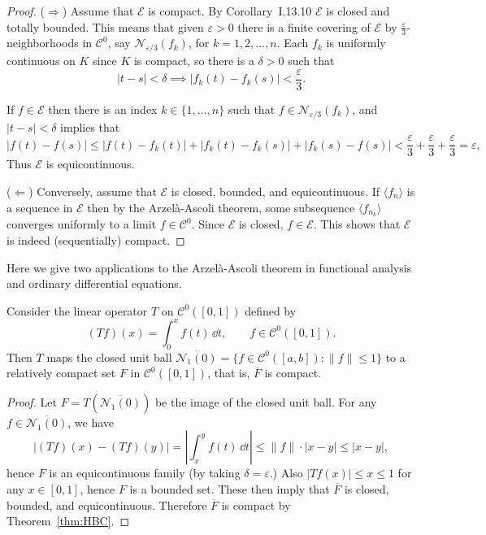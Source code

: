 \documentclass[11pt]{article}
\begin{document}
\begin{proof}
  ($\Rightarrow$) Assume that $\mathcal{E}$ is compact.
  By Corollary~I.13.10 $\mathcal{E}$ is closed and totally bounded.
  This means that given $\varepsilon > 0$ there is a finite covering of $\mathcal{E}$ by $\frac{\varepsilon}{3}$-neighborhoods in $\mathcal{C}^0$, say $\mathcal{N}_{\varepsilon/3}(f_k)$, for $k = 1, 2, \dots, n$.
  Each $f_k$ is uniformly continuous on $K$ since $K$ is compact, so there is a $\delta > 0$ such that
  \[
    |t-s| < \delta \implies |f_k(t) - f_k(s)| < \frac{\varepsilon}{3}.
  \]

  If $f \in \mathcal{E}$ then there is an index $k \in \{ 1, \dots, n \}$ such that $f \in \mathcal{N}_{\varepsilon/3}(f_k)$, and $|t-s| < \delta$ implies that
  \[
    |f(t) - f(s)| \leqslant |f(t) - f_k(t)| + |f_k(t) - f_k(s)| + |f_k(s) - f(s)| < \frac{\varepsilon}{3} + \frac{\varepsilon}{3} + \frac{\varepsilon}{3} = \varepsilon,
  \]
  Thus $\mathcal{E}$ is equicontinuous.

  ($\Leftarrow$) Conversely, assume that $\mathcal{E}$ is closed, bounded, and equicontinuous.
  If $\langle f_n \rangle$ is a sequence in $\mathcal{E}$ then by the Arzel\`a-Ascoli theorem, some subsequence $\langle f_{n_k} \rangle$ converges uniformly to a limit $f \in \mathcal{C}^0$.
  Since $\mathcal{E}$ is closed, $f \in \mathcal{E}$.
  This shows that $\mathcal{E}$ is indeed (sequentially) compact.
\end{proof}

Here we give two applications to the Arzel\`a-Ascoli theorem in functional analysis and ordinary differential equations.

\begin{cor}
  Consider the linear operator $T$ on $\mathcal{C}^0([0,1])$ defined by
  \[
    (Tf)(x) = \int_0^x f(t) \, \dd t, \qquad f \in \mathcal{C}^0([0,1]).
  \]
  Then $T$ maps the closed unit ball $\overline{\mathcal{N}_1(0)} = \{  f \in \mathcal{C}^0([a,b]) \colon \| f \| \leqslant 1 \}$ to a relatively compact set $F$ in $\mathcal{C}^0([0,1])$, that is, $\overline{F}$ is compact.
\end{cor}

\begin{proof}
  Let $F = T(\overline{\mathcal{N}_1(0)})$ be the image of the closed unit ball.
  For any $f \in \overline{\mathcal{N}_1(0)}$, we have
  \[
    | (Tf)(x) - (Tf)(y) | = \left| \int_x^y f(t) \, \dd t \right| \leqslant \| f \| \cdot |x-y| \leqslant |x-y|,
  \]
  hence $F$ is an equicontinuous family (by taking $\delta = \varepsilon$.)
  Also $|Tf(x)| \leqslant x \leqslant 1$ for any $x \in [0,1]$, hence $F$ is a bounded set.
  These then imply that $\overline{F}$ is closed, bounded, and equicontinuous.
  Therefore $\overline{F}$ is compact by Theorem~\ref{thm:HBC}.
\end{proof}
\end{document}

